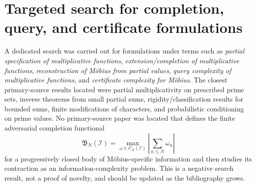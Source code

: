 \documentclass[11pt]{article}
\begin{document}
\section{Targeted search for completion, query, and certificate formulations}
A dedicated search was carried out for formulations under terms such as \emph{partial specification of multiplicative functions}, \emph{extension/completion of multiplicative functions}, \emph{reconstruction of Möbius from partial values}, \emph{query complexity of multiplicative functions}, and \emph{certificate complexity for Möbius}. The closest primary-source results located were partial multiplicativity on prescribed prime sets, inverse theorems from small partial sums, rigidity/classification results for bounded sums, finite modifications of characters, and probabilistic conditioning on prime values. No primary-source paper was located that defines the finite adversarial completion functional
\[
 \mathfrak B_N(\mathcal I)=\max_{\omega\in\mathcal C_N(\mathcal I)}\left|\sum_{n\le N}\omega_n\right|
\]
for a progressively closed body of Möbius-specific information and then studies its contraction as an information-complexity problem. This is a negative search result, not a proof of novelty, and should be updated as the bibliography grows.
\end{document}
